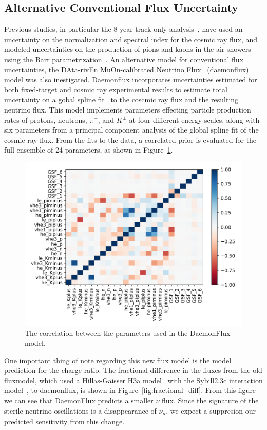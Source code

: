 \documentclass[main.tex]{subfiles}
\begin{document}
\subsection{Alternative Conventional Flux Uncertainty}\label{sec:daemon_sense}
Previous studies, in particular the 8-year track-only analysis~\cite{Aartsen_2020,Aartsen_2020_prd}, have used an uncertainty on the normalization and spectral index for the cosmic ray flux, and modeled uncertainties on the production of pions and kaons in the air showers using the Barr parametrization~\cite{PhysRevD.74.094009}. 
An alternative model for conventional flux uncertainties, the DAta-rivEn MuOn-calibrated Neutrino Flux~\cite{yanez2023daemonflux} (daemonflux) model was also inestigated. 
Daemonflux incorporates uncertainties estimated for both fixed-target and cosmic ray experimental results to estimate total uncertainty on a gobal spline fit~\cite{dembinski2017datadriven} to the coscmic ray flux and the resulting neutrino flux. 
This model implements parameters effecting particle production rates of protons, neutrons, $\pi^{\pm}$, and $K^{\pm}$ at four different energy scales, along with six parameters from a principal component analysis of the global spline fit of the cosmic ray flux. 
From the fits to the data, a correlated prior is evaluated for the full ensemble of 24 parameters, as shown in Figure~\ref{fig:daemon_cor}.
\begin{figure}
    \centering
    \includegraphics[width=0.7\linewidth]{figures/daemon_cov.png}
    \caption{The correlation between the parameters used in the DaemonFlux model.}\label{fig:daemon_cor}
\end{figure}

One important thing of note regarding this new flux model is the model prediction for the charge ratio. 
The fractional difference in the fluxes from the old fluxmodel, which used a Hillas-Gaisser H3a model~\cite{GAISSER2012801} with the Sybill2.3c interaction model~\cite{Riehn:2017mfm}, to daemonflux, is shown in Figure~\ref{fig:fractional_diff}. 
From this figure we can see that DaemonFlux predicts a smaller $\bar{\nu}$ flux. 
Since the signature of the sterile neutrino oscillations is a disappearance of $\bar{\nu}_{\mu}$, we expect a suppresion our predicted sensitivity from this change.
\end{document}
